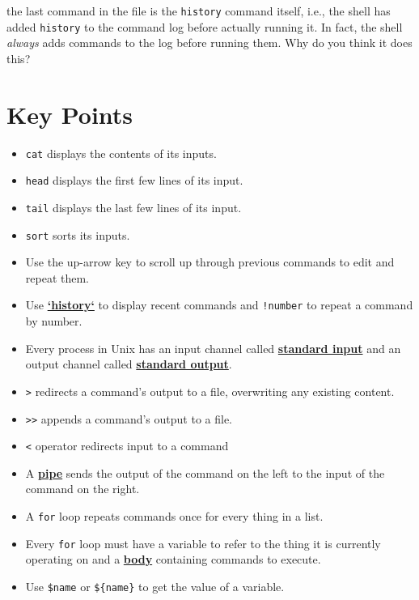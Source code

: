 \documentclass[
]{krantz}
\providecommand{\tightlist}{%
  \setlength{\itemsep}{0pt}\setlength{\parskip}{0pt}}
\newcommand{\gref}[2]{\hyperlink{#2}{\textbf{#1}}}
\begin{document}
the last command in the file is the \texttt{history} command itself, i.e.,
the shell has added \texttt{history} to the command log before actually
running it. In fact, the shell \emph{always} adds commands to the log
before running them. Why do you think it does this?

\hypertarget{bash-tools-keypoints}{%
\section{Key Points}\label{bash-tools-keypoints}}

\begin{itemize}
\tightlist
\item
  \texttt{cat} displays the contents of its inputs.
\item
  \texttt{head} displays the first few lines of its input.
\item
  \texttt{tail} displays the last few lines of its input.
\item
  \texttt{sort} sorts its inputs.
\item
  Use the up-arrow key to scroll up through previous commands to edit and repeat them.
\item
  Use \gref{`history`}{command\_history} to display recent commands and \texttt{!number} to repeat a command by number.
\item
  Every process in Unix has an input channel called \gref{standard input}{stdin}
  and an output channel called \gref{standard output}{stdin}.
\item
  \texttt{\textgreater{}} redirects a command's output to a file, overwriting any existing content.
\item
  \texttt{\textgreater{}\textgreater{}} appends a command's output to a file.
\item
  \texttt{\textless{}} operator redirects input to a command
\item
  A \gref{pipe}{pipe\_shell} \texttt{\textbar{}} sends the output of the command on the left to the input of the command on the right.
\item
  A \texttt{for} loop repeats commands once for every thing in a list.
\item
  Every \texttt{for} loop must have a variable to refer to the thing it is currently operating on
  and a \gref{body}{loop\_body} containing commands to execute.
\item
  Use \texttt{\$name} or \texttt{\$\{name\}} to get the value of a variable.
\end{itemize}
\end{document}
